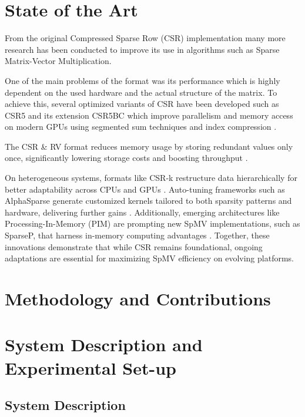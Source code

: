 \documentclass[conference]{IEEEtran}
\begin{document}
    \section{State of the Art}

    From the original Compressed Sparse Row (CSR) \cite{eisenstat1977csr} implementation
    many more research has been conducted to improve its use in algorithms such as
    Sparse Matrix-Vector Multiplication.

    One of the main problems of the format was its performance which is highly dependent
    on the used hardware and the actual structure of the matrix.
    To achieve this, several optimized variants of CSR have been developed such as
    CSR5 and its extension CSR5BC which improve parallelism and memory access on
    modern GPUs using segmented sum techniques and index compression \cite{zhang2016csr5}.

    The CSR \& RV format reduces memory usage by storing redundant values only once,
    significantly lowering storage costs and boosting throughput \cite{tang2023csrrv}.

    On heterogeneous systems, formats like CSR-k restructure data hierarchically
    for better adaptability across CPUs and GPUs \cite{liu2022csrk}.
    Auto-tuning frameworks such as AlphaSparse generate customized kernels tailored
    to both sparsity patterns and hardware, delivering further gains \cite{yin2022alphasparse}. Additionally, emerging architectures like Processing-In-Memory (PIM) are prompting new SpMV implementations, such as SparseP, that harness in-memory computing advantages \cite{lee2022sparsep}. Together, these innovations demonstrate that while CSR remains foundational, ongoing adaptations are essential for maximizing SpMV efficiency on evolving platforms.

    \section{Methodology and Contributions}\label{sec:methodology}

    \section{System Description and Experimental Set-up}
        \subsection{System Description}
\end{document}
